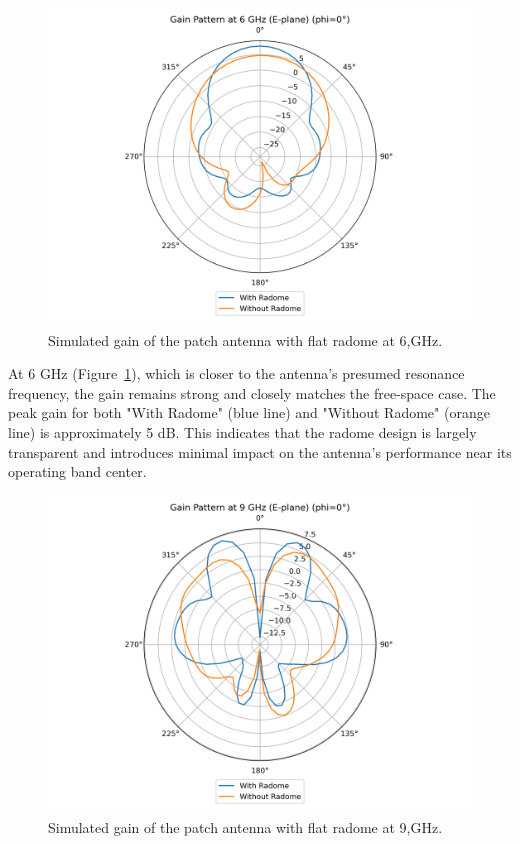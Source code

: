 \begin{figure}[H]
\centering
\includegraphics[width=1.0\textwidth]{figures/comparison_flat_radome/gainE_6_GHz.png}
\caption{Simulated gain of the patch antenna with flat radome at 6,GHz.}
\label{fig:res-flat-gainE6}
\end{figure}

At 6 GHz (Figure~\ref{fig:res-flat-gainE6}), which is closer to the antenna's presumed resonance frequency, the gain remains strong and closely matches the free-space case. The peak gain for both "With Radome" (blue line) and "Without Radome" (orange line) is approximately 5 dB. This indicates that the radome design is largely transparent and introduces minimal impact on the antenna's performance near its operating band center.

\begin{figure}[H]
\centering
\includegraphics[width=1.0\textwidth]{figures/comparison_flat_radome/gainE_9_GHz.png}
\caption{Simulated gain of the patch antenna with flat radome at 9,GHz.}
\label{fig:res-flat-gainE9}
\end{figure}

